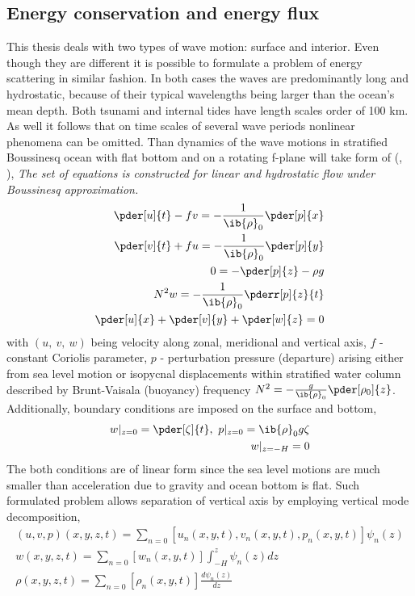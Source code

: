 \subsection{Energy conservation and energy flux}
This thesis deals with two types of wave motion: surface and interior. Even though they are different it is possible to formulate a problem of energy scattering in similar fashion. In both cases the waves are predominantly long and hydrostatic, because of their typical wavelengths being larger than the ocean's mean depth. Both tsunami and internal tides have length scales order of 100 km. As well it follows that on time scales of several wave periods nonlinear phenomena can be omitted. Than dynamics of the wave motions in stratified Boussinesq ocean with flat bottom and on a rotating f-plane will take form of (\cite{kundu2008fluid}, \cite{cushman2011introduction}),
\textit{The set of equations is constructed for linear and hydrostatic flow under Boussinesq approximation. }
\begin{align}
\pder[u]{t} - f v = -\frac{1}{\ib{\rho}_0}\pder[p]{x}\\
\pder[v]{t} + f u = -\frac{1}{\ib{\rho}_0}\pder[p]{y}\\
0 = -\pder[p]{z} - \rho g\\
N^2 w = -\frac{1}{\ib{\rho}_0} \pderr[p]{z}{t}\\
\pder[u]{x} + \pder[v]{y} + \pder[w]{z} = 0
\end{align}
with $(u,~v,~w)$ being velocity along zonal, meridional and vertical axis, $f$ - constant Coriolis parameter, $p$ - perturbation pressure (departure) arising either from sea level motion or isopycnal displacements within stratified water column described by Brunt-Vaisala (buoyancy) frequency $N^2 = -\frac{g}{\ib{\rho}_0}\pder[\rho_0]{z}$. Additionally, boundary conditions are imposed on the surface and bottom,
\begin{align}
w|_{z = 0} = \pder[\zeta]{t},~p|_{z = 0} = \ib{\rho}_0 g \zeta\\
w|_{z = -H} = 0
\end{align}
The both conditions are of linear form since the sea level motions are much smaller than acceleration due to gravity and ocean bottom is flat. Such formulated problem allows separation of vertical axis by employing vertical mode decomposition,
\begin{align}
(u, v, p)(x,y,z,t) = \sum_{n = 0} [u_n(x,y,t), v_n(x,y,t), p_n(x,y,t)]\psi_n(z)\\
w(x,y,z,t) = \sum_{n = 0} [w_n(x,y,t)] \int_{-H}^z \psi_n(z) dz\\
\rho(x,y,z,t) = \sum_{n = 0} [\rho_n(x,y,t)] \frac{d \psi_n(z)}{dz}
\end{align}
